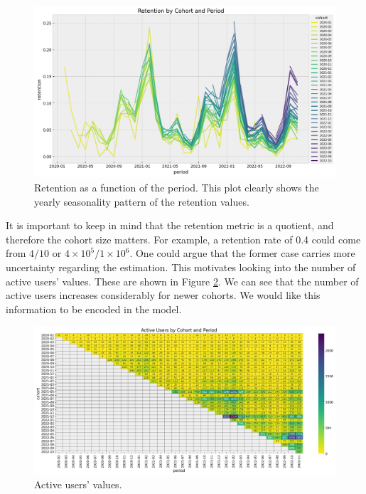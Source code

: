 \documentclass[11pt]{amsart}
\begin{document}
\begin{figure}
    \centering
    \includegraphics[width=\textwidth]{images/revenue_retention_19_0.png}
    \caption{Retention as a function of the period. This plot clearly shows the yearly
    seasonality pattern of the retention values.}
    \label{fig:retention_seasonal}
\end{figure}

It is important to keep in mind that the retention metric is a quotient, and therefore
the cohort size matters. For example, a retention rate of 0.4 could come from $4/10$ or
$4\times 10^{5} / 1 \times 10^{6}$. One could argue that the former case carries more
uncertainty regarding the estimation. This motivates looking into the number of active
users' values. These are shown in Figure \ref{fig:active_users}. We can see that the
number of active users increases considerably for newer cohorts. We would like this
information to be encoded in the model.


\begin{figure}
    \centering
    \includegraphics[width=\textwidth]{images/revenue_retention_21_0.png}
    \caption{Active users' values.}
    \label{fig:active_users}
\end{figure}
\end{document}
